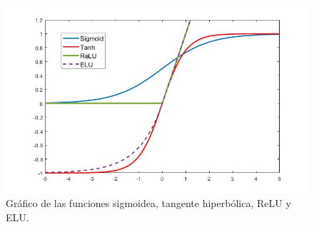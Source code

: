 \documentclass[11pt,a4paper,openany]{article}
\begin{document}
\newpage

        
\begin{figure}[H]
            \centering
            \includegraphics[width=0.8\linewidth]{Out-Actfuntions.jpg}
            \caption{Gráfico de las funciones sigmoidea, tangente hiperbólica, ReLU y ELU.}
            \label{fig:plotSIG-TANG-ReLU-ELU}
        \end{figure}

\end{document}
